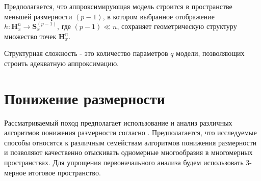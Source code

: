 \documentclass[12pt,twoside]{article}
\begin{document}
Предполагается, что аппроксимирующая модель строится в пространстве меньшей размерности $(p-1)$, в котором выбранное отображение $h: \mathbf{H}_{x}^{n} \xrightarrow{} \mathbf{S}_x^{(p-1)} $, где $(p-1)\ll n$, сохраняет геометрическую структуру множество точек $\mathbf{H}_{x}^{n}$. 
\vspace{\baselineskip}

\begin{Def}
Структурная сложность - это количество параметров $q$ модели, позволяющих строить адекватную аппроксимацию.
\end{Def}

\section{Понижение размерности}
Рассматриваемый поход предполагает использование и анализ различных алгоритмов понижения размерности согласно \cite{Maaten2007}.
Предполагается, что исследуемые способы относятся к различным семействам алгоритмов понижения размерности и позволяют качественно отыскивать одномерные многообразия в многомерных пространствах.
Для упрощения первоначального анализа будем использовать 3-мерное итоговое пространство.
\end{document}
